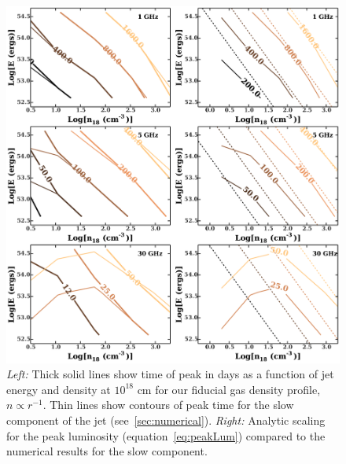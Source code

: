 \documentclass[usenatbib,fleqn]{mnras}
\begin{document}
\begin{figure}
  \includegraphics[width=16cm]{tp_contours_new.pdf}
  \caption{\label{fig:ContoursTp} {\it {Left:}} Thick solid lines show
    time of peak in days as a function of jet energy and density at
    $10^{18}$ cm for our fiducial gas density profile, $n\propto
    r^{-1}$. Thin lines show contours of peak time for the slow
    component of the jet (see~\ref{sec:numerical}). {\it Right:}
    Analytic scaling for the peak luminosity
    (equation~\ref{eq:peakLum}) compared to the numerical results for
    the slow component.}
\end{figure}




\end{document}
